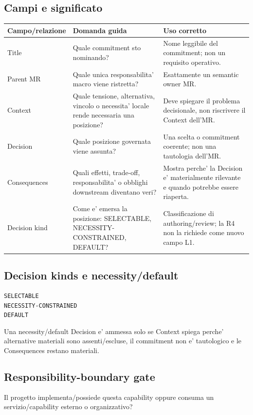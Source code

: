 \documentclass[11pt,a4paper]{article}
\begin{document}
\subsection{Campi e significato}

\begin{longtable}{L{35mm}L{48mm}L{60mm}}
\toprule
\textbf{Campo/relazione} & \textbf{Domanda guida} & \textbf{Uso corretto} \\
\midrule\endhead
Title & Quale commitment sto nominando? & Nome leggibile del commitment; non un requisito operativo. \\
Parent MR & Quale unica responsabilita' macro viene ristretta? & Esattamente un semantic owner MR. \\
Context & Quale tensione, alternativa, vincolo o necessita' locale rende necessaria una posizione? & Deve spiegare il problema decisionale, non riscrivere il Context dell'MR. \\
Decision & Quale posizione governata viene assunta? & Una scelta o commitment coerente; non una tautologia dell'MR. \\
Consequences & Quali effetti, trade-off, responsabilita' o obblighi downstream diventano veri? & Mostra perche' la Decision e' materialmente rilevante e quando potrebbe essere riaperta. \\
Decision kind & Come e' emersa la posizione: SELECTABLE, NECESSITY-CONSTRAINED, DEFAULT? & Classificazione di authoring/review; la R4 non la richiede come nuovo campo L1. \\
\bottomrule
\end{longtable}

\subsection{Decision kinds e necessity/default}

\begin{lstlisting}
SELECTABLE
NECESSITY-CONSTRAINED
DEFAULT
\end{lstlisting}

Una necessity/default Decision e' ammessa solo se Context spiega perche' alternative materiali sono assenti/escluse, il commitment non e' tautologico e le Consequences restano materiali.

\subsection{Responsibility-boundary gate}

\begin{ddtacheck}[title={Domanda prima degli FR}]
Il progetto implementa/possiede questa capability oppure consuma un servizio/capability esterno o organizzativo?
\end{ddtacheck}
\end{document}
